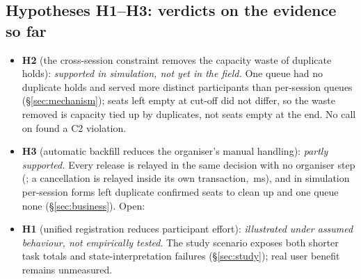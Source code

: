 \subsection{Hypotheses H1--H3: verdicts on the evidence so far}\label{sec:hypotheses}
\begin{itemize}
\item \textbf{H2} (the cross-session constraint removes the capacity waste of duplicate holds):
  \emph{supported in simulation, not yet in the field.} One queue had no duplicate holds and
  served more distinct participants than per-session queues (\S\ref{sec:mechanism}); seats left empty at cut-off did not differ, so the waste removed is
  capacity tied up by duplicates, not seats empty at the end. No  call on 
  found a C2 violation.
\item \textbf{H3} (automatic backfill reduces the organiser's manual handling): \emph{partly
  supported.} Every release is relayed in the same decision with no organiser step
  (; a cancellation is
  relayed inside its own transaction, \SmokeCancelBackfillMs\,ms), and in simulation per-session forms left
  duplicate confirmed seats to clean up and one queue none (\S\ref{sec:business}). Open: 
\item \textbf{H1} (unified registration reduces participant effort): \emph{illustrated under
  assumed behaviour, not empirically tested}. The study scenario exposes both shorter task totals
  and state-interpretation failures (\S\ref{sec:study}); real user benefit remains unmeasured.
\end{itemize}
